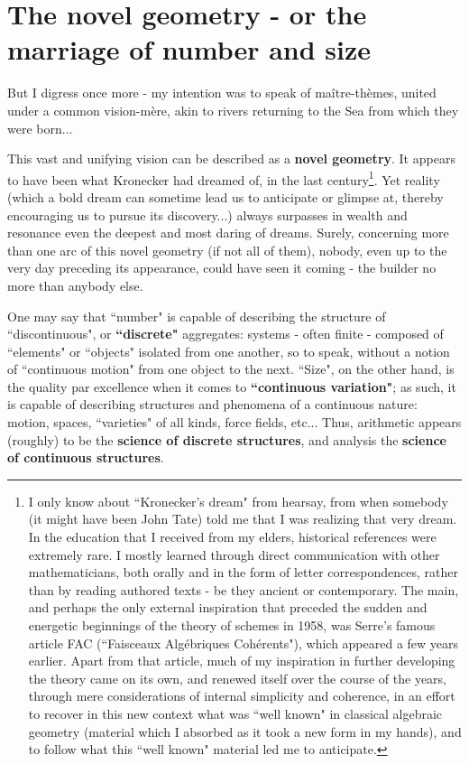 \section{The novel geometry - or the marriage of number and size}

But I digress once more - my intention was to speak of ma\^itre-th\`emes, united under a common vision-m\`ere, akin to rivers returning to the Sea from which they were born...

This vast and unifying vision can be described as a \textbf{novel geometry}. It appears to have been what Kronecker had dreamed of, in the last century\footnote{I only know about ``Kronecker's dream" from hearsay, from when somebody (it might have been John Tate) told me that I was realizing that very dream. In the education that I received from my elders, historical references were extremely rare. I mostly learned through direct communication with other mathematicians, both orally and in the form of letter correspondences, rather than by reading authored texts - be they ancient or contemporary. The main, and perhaps the only external inspiration that preceded the sudden and energetic beginnings of the theory of schemes in 1958, was Serre's famous article FAC (``Faisceaux Alg\'ebriques Coh\'erents"), which appeared a few years earlier. Apart from that article, much of my inspiration in further developing the theory came on its own, and renewed itself over the course of the years, through mere considerations of internal simplicity and coherence, in an effort to recover in this new context what was ``well known" in classical algebraic geometry (material which I absorbed as it took a new form in my hands), and to follow what this ``well known" material led me to anticipate.}. Yet reality (which a bold dream can sometime lead us to anticipate or glimpse at, thereby encouraging us to pursue its discovery...) always surpasses in wealth and resonance even the deepest and most daring of dreams. Surely, concerning more than one arc of this novel geometry (if not all of them), nobody, even up to the very day preceding its appearance, could have seen it coming - the builder no more than anybody else. 

One may say that ``number" is capable of describing the structure of ``discontinuous", or \textbf{``discrete"} aggregates: systems - often finite - composed of ``elements" or ``objects" isolated from one another, so to speak, without a notion of ``continuous motion" from one object to the next. ``Size", on the other hand, is the quality par excellence when it comes to \textbf{``continuous variation"}; as such, it is capable of describing structures and phenomena of a continuous nature: motion, spaces, ``varieties" of all kinds, force fields, etc... Thus, arithmetic appears (roughly) to be the \textbf{science of discrete structures}, and analysis the \textbf{science of continuous structures}.

